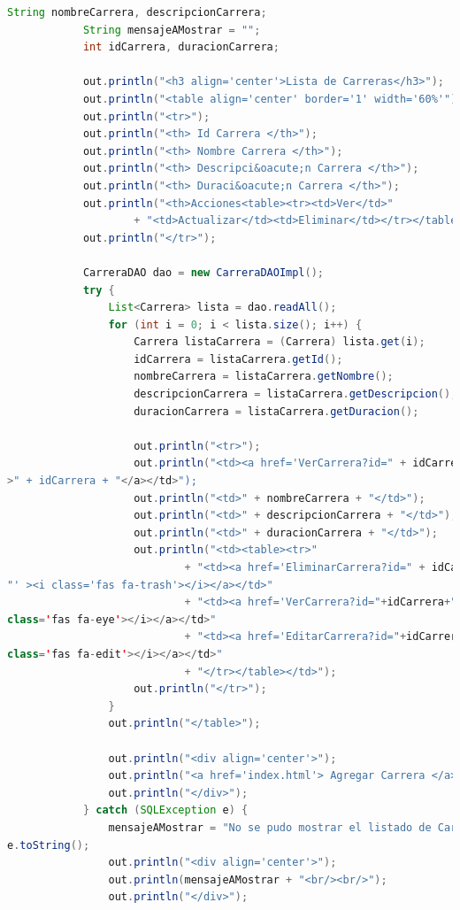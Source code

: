 \documentclass[a4paper,12pt]{article}
\begin{document}
\begin{lstlisting}[language=Java, style=customJava, 
caption={MostrarCarrera.java},captionpos=b,basicstyle=\fontfamily{cmss}\small]
            String nombreCarrera, descripcionCarrera;
            String mensajeAMostrar = "";
            int idCarrera, duracionCarrera;

            out.println("<h3 align='center'>Lista de Carreras</h3>");
            out.println("<table align='center' border='1' width='60%'");
            out.println("<tr>");
            out.println("<th> Id Carrera </th>");
            out.println("<th> Nombre Carrera </th>");
            out.println("<th> Descripci&oacute;n Carrera </th>");
            out.println("<th> Duraci&oacute;n Carrera </th>");
            out.println("<th>Acciones<table><tr><td>Ver</td>"
                    + "<td>Actualizar</td><td>Eliminar</td></tr></table></th>");
            out.println("</tr>");

            CarreraDAO dao = new CarreraDAOImpl();
            try {
                List<Carrera> lista = dao.readAll();
                for (int i = 0; i < lista.size(); i++) {
                    Carrera listaCarrera = (Carrera) lista.get(i);
                    idCarrera = listaCarrera.getId();
                    nombreCarrera = listaCarrera.getNombre();
                    descripcionCarrera = listaCarrera.getDescripcion();
                    duracionCarrera = listaCarrera.getDuracion();

                    out.println("<tr>");
                    out.println("<td><a href='VerCarrera?id=" + idCarrera + "' 
>" + idCarrera + "</a></td>");
                    out.println("<td>" + nombreCarrera + "</td>");
                    out.println("<td>" + descripcionCarrera + "</td>");
                    out.println("<td>" + duracionCarrera + "</td>");
                    out.println("<td><table><tr>"
                            + "<td><a href='EliminarCarrera?id=" + idCarrera + 
"' ><i class='fas fa-trash'></i></a></td>"
                            + "<td><a href='VerCarrera?id="+idCarrera+"'><i 
class='fas fa-eye'></i></a></td>"
                            + "<td><a href='EditarCarrera?id="+idCarrera+"'><i 
class='fas fa-edit'></i></a></td>"
                            + "</tr></table></td>");
                    out.println("</tr>");
                }
                out.println("</table>");

                out.println("<div align='center'>");
                out.println("<a href='index.html'> Agregar Carrera </a>");
                out.println("</div>");
            } catch (SQLException e) {
                mensajeAMostrar = "No se pudo mostrar el listado de Carreras" + 
e.toString();
                out.println("<div align='center'>");
                out.println(mensajeAMostrar + "<br/><br/>");
                out.println("</div>");
                

\end{lstlisting}
\end{document}
